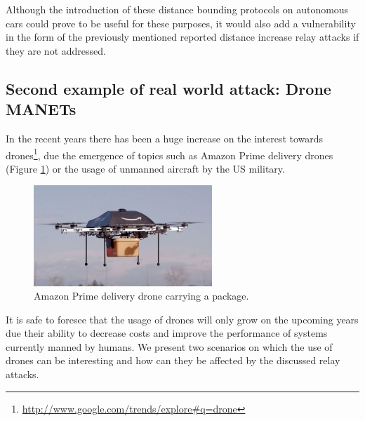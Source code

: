 \documentclass{article}
\begin{document}
Although the introduction of these distance bounding protocols on autonomous cars could prove to be useful for these purposes, it would also add a vulnerability in the form of the previously mentioned reported distance increase relay attacks if they are not addressed.\\


\subsection{Second example of real world attack: Drone MANETs}

In the recent years there has been a huge increase on the interest towards drones\footnote{\url{http://www.google.com/trends/explore#q=drone}}, due the emergence of topics such as Amazon Prime delivery drones (Figure \ref{fig:amazondrone}) or the usage of unmanned aircraft by the US military.\\


\begin{figure}[h!]
  \centering
    \includegraphics[width=0.6\textwidth]{images/amazonprimedrone.png}
  \caption{Amazon Prime delivery drone carrying a package.}
  \label{fig:amazondrone}
\end{figure}

It is safe to foresee that the usage of drones will only grow on the upcoming years due their ability to decrease costs and improve the performance of systems currently manned by humans. We present two scenarios on which the use of drones can be interesting and how can they be affected by the discussed relay attacks.\\
\end{document}
